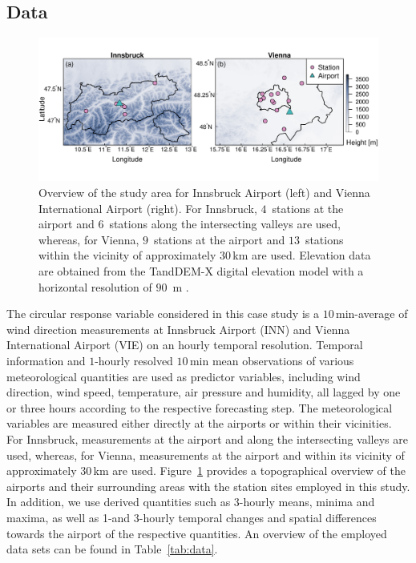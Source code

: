 \documentclass[nojss,shortnames]{jss}
\numberwithin{equation}{section}
\begin{document}
\subsection{Data}
\begin{figure}[t]
  \centering
  \includegraphics{_plot_circforest_stationmap_combined.pdf}
  \caption{Overview of the study area for Innsbruck Airport (left) and Vienna International Airport (right). 
    For Innsbruck, $4$~stations at the airport and $6$~stations along the
    intersecting valleys are used, whereas, for Vienna, $9$~stations at the airport
    and $13$~stations within the vicinity of approximately 30\,km are used.
    Elevation data are obtained from the TandDEM-X digital elevation model with a 
    horizontal resolution of $90$~m \citep{Wessel:2018}.}
  \label{fig:overview} 
\end{figure}
\label{sec:wind:data}
The circular response variable considered in this case study is a
$10$\,min-average of wind direction measurements at Innsbruck Airport (INN) and
Vienna International Airport (VIE) on an hourly temporal resolution. Temporal
information and $1$-hourly resolved $10$\,min mean observations of various
meteorological quantities are used as predictor variables, including wind
direction, wind speed, temperature, air pressure and humidity, all lagged by
one or three hours according to the respective forecasting step. The
meteorological variables are measured either directly at the airports or within
their vicinities. For Innsbruck, measurements at the airport and along the
intersecting valleys are used, whereas, for Vienna, measurements at the airport
and within its vicinity of approximately 30\,km are used.
Figure~\ref{fig:overview} provides a topographical overview of the airports and
their surrounding areas with the station sites employed in this study. In
addition, we use derived quantities such as 3-hourly means, minima and maxima,
as well as 1-and 3-hourly temporal changes and spatial differences towards the
airport of the respective quantities. An overview of the employed data sets can
be found in Table~\ref{tab:data}. 
\end{document}
